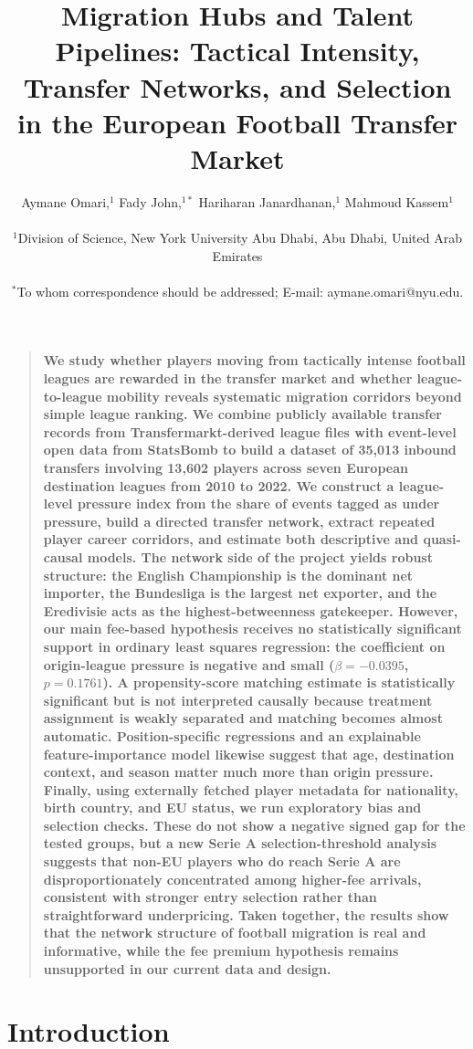 \documentclass[12pt]{article}
\title{Migration Hubs and Talent Pipelines: Tactical Intensity, Transfer Networks, and Selection in the European Football Transfer Market}
\author
{Aymane Omari,$^{1}$ Fady John,$^{1\ast}$ Hariharan Janardhanan,$^{1}$ Mahmoud Kassem$^{1}$\\
\\
\normalsize{$^{1}$Division of Science, New York University Abu Dhabi, Abu Dhabi, United Arab Emirates}\\
\\
\normalsize{$^\ast$To whom correspondence should be addressed; E-mail: aymane.omari@nyu.edu.}
}
\date{}
\newenvironment{sciabstract}{%
\begin{quote} \bf}
{\end{quote}}
\begin{document}
\baselineskip24pt
\maketitle

\begin{sciabstract}
We study whether players moving from tactically intense football leagues are rewarded in the transfer market and whether league-to-league mobility reveals systematic migration corridors beyond simple league ranking. We combine publicly available transfer records from Transfermarkt-derived league files with event-level open data from StatsBomb to build a dataset of 35,013 inbound transfers involving 13,602 players across seven European destination leagues from 2010 to 2022. We construct a league-level pressure index from the share of events tagged as under pressure, build a directed transfer network, extract repeated player career corridors, and estimate both descriptive and quasi-causal models. The network side of the project yields robust structure: the English Championship is the dominant net importer, the Bundesliga is the largest net exporter, and the Eredivisie acts as the highest-betweenness gatekeeper. However, our main fee-based hypothesis receives no statistically significant support in ordinary least squares regression: the coefficient on origin-league pressure is negative and small ($\beta=-0.0395$, $p=0.1761$). A propensity-score matching estimate is statistically significant but is not interpreted causally because treatment assignment is weakly separated and matching becomes almost automatic. Position-specific regressions and an explainable feature-importance model likewise suggest that age, destination context, and season matter much more than origin pressure. Finally, using externally fetched player metadata for nationality, birth country, and EU status, we run exploratory bias and selection checks. These do not show a negative signed gap for the tested groups, but a new Serie A selection-threshold analysis suggests that non-EU players who do reach Serie A are disproportionately concentrated among higher-fee arrivals, consistent with stronger entry selection rather than straightforward underpricing. Taken together, the results show that the network structure of football migration is real and informative, while the fee premium hypothesis remains unsupported in our current data and design.
\end{sciabstract}

\section*{Introduction}
\end{document}
